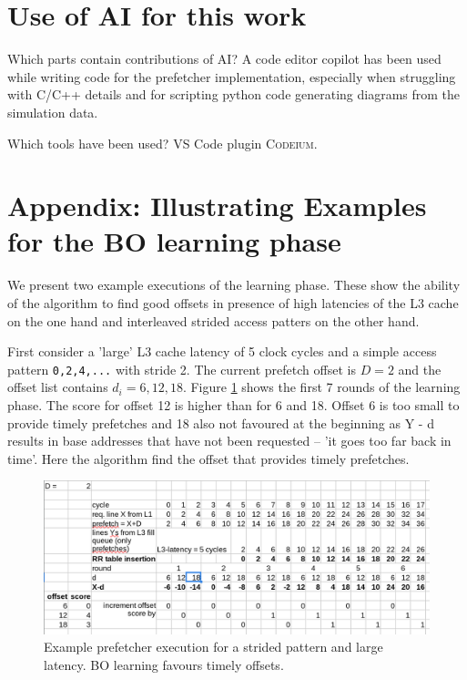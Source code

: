 \documentclass[conference]{IEEEtran}
\begin{document}


\newpage
\section{Use of AI for this work}


Which parts contain contributions of AI?
A code editor copilot has been used
while writing code for the prefetcher implementation, especially when struggling with C/C++ details
and for scripting python code generating diagrams from the simulation data.

Which tools have been used?
VS Code plugin \textsc{Codeium}.

\newpage
\section{Appendix: Illustrating Examples for the BO learning phase}\label{sec:appendix_bo_learning_example}

We present two example executions of the learning phase.
These show the ability of the algorithm to find good offsets in presence
of high latencies of the L3 cache on the one hand
and interleaved strided access patters on the other hand.

First consider a 'large' L3 cache latency of 5 clock cycles and a simple access pattern \texttt{0,2,4,...} with stride 2.
The current prefetch offset is $D=2$ and the offset list contains $d_i = 6,12,18$.
Figure \ref{fig:bo-prefetcher-execution-high-latancy} shows the first 7 rounds of the learning phase.
The score for offset 12 is higher than for 6 and 18. Offset 6 is too small to provide timely prefetches and 18 also not favoured at the beginning as Y - d results in base addresses that have not been requested -- 'it goes too far back in time'.
Here the algorithm find the offset that provides timely prefetches.
\begin{figure}[h]
    \centering
    \includegraphics[width=1.0\columnwidth]{figures/example_demonstrating_impact_of_high_latency.png}
    \caption{Example prefetcher execution for a strided pattern and large latency. BO learning favours timely offsets.}
    \label{fig:bo-prefetcher-execution-high-latancy}
\end{figure}
\end{document}
